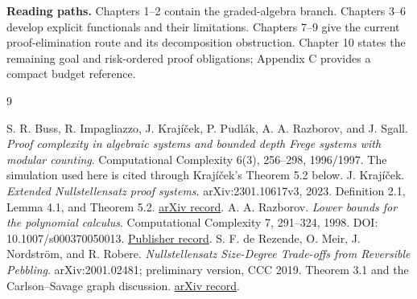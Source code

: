 \documentclass[11pt,oneside]{report}
\theoremstyle{research}
\theoremstyle{definition}
\theoremstyle{remark}
\begin{document}
\textbf{Reading paths.} Chapters 1--2 contain the graded-algebra branch. Chapters 3--6 develop explicit functionals and their limitations. Chapters 7--9 give the current proof-elimination route and its decomposition obstruction. Chapter 10 states the remaining goal and risk-ordered proof obligations; Appendix C provides a compact budget reference.
\tableofcontents
\clearpage
{}










\appendix
{}

\begin{thebibliography}{9}
 S. R. Buss, R. Impagliazzo, J. Kraj\'i\v{c}ek, P. Pudl\'ak, A. A. Razborov, and J. Sgall. \emph{Proof complexity in algebraic systems and bounded depth Frege systems with modular counting}. Computational Complexity 6(3), 256--298, 1996/1997. The simulation used here is cited through Kraj\'i\v{c}ek's Theorem 5.2 below.
 J. Kraj\'i\v{c}ek. \emph{Extended Nullstellensatz proof systems}. arXiv:2301.10617v3, 2023. Definition 2.1, Lemma 4.1, and Theorem 5.2. \href{https://arxiv.org/abs/2301.10617}{arXiv record}.
 A. A. Razborov. \emph{Lower bounds for the polynomial calculus}. Computational Complexity 7, 291--324, 1998. DOI: 10.1007/s000370050013. \href{https://doi.org/10.1007/s000370050013}{Publisher record}.
 S. F. de Rezende, O. Meir, J. Nordstr\"om, and R. Robere. \emph{Nullstellensatz Size-Degree Trade-offs from Reversible Pebbling}. arXiv:2001.02481; preliminary version, CCC 2019. Theorem 3.1 and the Carlson--Savage graph discussion. \href{https://arxiv.org/abs/2001.02481}{arXiv record}.
\end{thebibliography}
\end{document}

